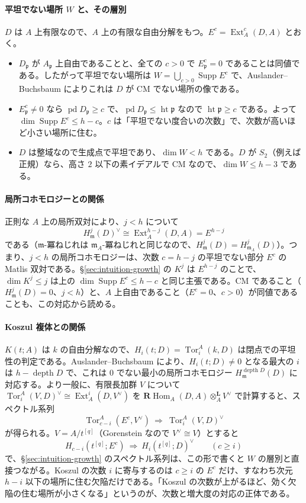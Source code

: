 \documentclass[11pt,a4paper]{ltjsarticle}
\numberwithin{equation}{section}
\theoremstyle{plain}
\theoremstyle{definition}
\theoremstyle{definition}
\newcommand{\m}{\mathfrak{m}}
\newcommand{\Tor}{\operatorname{Tor}}
\providecommand{\Ext}{\operatorname{Ext}}
\begin{document}
\paragraph{平坦でない場所 $W$ と、その層別}
$D$ は $A$ 上有限なので、$A$ 上の有限な自由分解をもつ。$E^c = \Ext^c_A(D,A)$ とおく。
\begin{itemize}
  \item $D_\mathfrak{p}$ が $A_\mathfrak{p}$ 上自由であることと、全ての $c>0$ で $E^c_\mathfrak{p} = 0$ であることは同値である。したがって平坦でない場所は $W = \bigcup_{c>0}\operatorname{Supp}E^c$ で、Auslander--Buchsbaum によりこれは $D$ が CM でない場所の像である。
  \item $E^c_\mathfrak{p}\neq0$ なら $\operatorname{pd}D_\mathfrak{p}\ge c$ で、$\operatorname{pd}D_\mathfrak{p}\le\operatorname{ht}\mathfrak{p}$ なので $\operatorname{ht}\mathfrak{p}\ge c$ である。よって $\dim\operatorname{Supp}E^c\le h-c$。$c$ は「平坦でない度合いの次数」で、次数が高いほど小さい場所に住む。
  \item $D$ は整域なので生成点で平坦であり、$\dim W<h$ である。$D$ が $S_2$（例えば正規）なら、高さ $2$ 以下の素イデアルで CM なので、$\dim W\le h-3$ である。
\end{itemize}

\paragraph{局所コホモロジーとの関係}
正則な $A$ 上の局所双対により、$j<h$ について
\[
  H^j_\m(D)^\vee\cong\Ext_A^{h-j}(D,A) = E^{h-j}
\]
である（$\m$-冪ねじれは $\m_A$-冪ねじれと同じなので、$H^j_\m(D) = H^j_{\m_A}(D)$）。つまり、$j<h$ の局所コホモロジーは、次数 $c = h-j$ の平坦でない部分 $E^c$ の Matlis 双対である。\S\ref{sec:intuition-growth} の $K^j$ は $E^{h-j}$ のことで、$\dim K^j\le j$ は上の $\dim\operatorname{Supp}E^c\le h-c$ と同じ主張である。CM であること（$H^j_\m(D) = 0$、$j<h$）と、$A$ 上自由であること（$E^c = 0$、$c>0$）が同値であることも、この対応から読める。

\paragraph{Koszul 複体との関係}
$K(t;A)$ は $k$ の自由分解なので、$H_i(t;D) = \Tor^A_i(k,D)$ は閉点での平坦性の判定である。Auslander--Buchsbaum により、$H_i(t;D)\neq0$ となる最大の $i$ は $h-\operatorname{depth}D$ で、これは $0$ でない最小の局所コホモロジー $H^{\operatorname{depth}D}_\m(D)$ に対応する。より一般に、有限長加群 $V$ について $\Tor_i^A(V,D)^\vee\cong\Ext^i_A(D,V^\vee)$ を $\mathbf{R}\!\operatorname{Hom}_A(D,A)\otimes^{\mathbf{L}}_A V^\vee$ で計算すると、スペクトル系列
\[
  \Tor^A_{c-i}(E^c, V^\vee)\ \Longrightarrow\ \Tor_i^A(V,D)^\vee
\]
が得られる。$V = A/t^{[q]}$（Gorenstein なので $V^\vee\cong V$）とすると
\[
  H_{c-i}(t^{[q]};E^c)\ \Longrightarrow\ H_i(t^{[q]};D)^\vee \qquad (c\ge i)
\]
で、\S\ref{sec:intuition-growth} のスペクトル系列は、この形で書くと $W$ の層別と直接つながる。Koszul の次数 $i$ に寄与するのは $c\ge i$ の $E^c$ だけ、すなわち次元 $h-i$ 以下の場所に住む欠陥だけである。「Koszul の次数が上がるほど、効く欠陥の住む場所が小さくなる」というのが、次数と増大度の対応の正体である。
\end{document}
